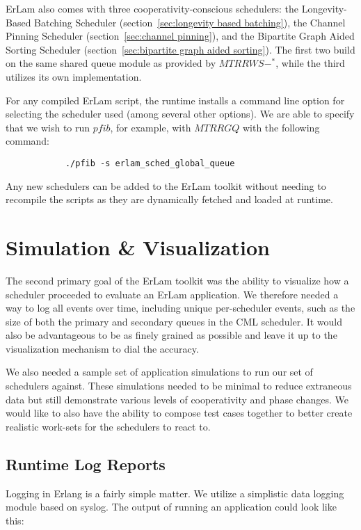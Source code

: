 ErLam also comes with three cooperativity-conscious schedulers: the 
Longevity-Based Batching Scheduler (section~\ref{sec:longevity based batching}),
the Channel Pinning Scheduler (section~\ref{sec:channel pinning}), and the
Bipartite Graph Aided Sorting Scheduler (section~\ref{sec:bipartite graph aided sorting}).
The first two build on the same shared queue module as provided by $MTRRWS-^{*}$, 
while the third utilizes its own implementation.

For any compiled ErLam script, the runtime installs a command line option for
selecting the scheduler used (among several other options). We are able to 
specify that we wish to run $pfib$, for example, with $MTRRGQ$ with
the following command:
\begin{verbatim}
            ./pfib -s erlam_sched_global_queue 
\end{verbatim}
\noindent
Any new schedulers can be added to the ErLam toolkit without needing to 
recompile the scripts as they are dynamically fetched and loaded at runtime. 

\section{Simulation \& Visualization}\label{sec:simulation and visualization}

The second primary goal of the ErLam toolkit was the ability to visualize 
how a scheduler proceeded to evaluate an ErLam application. We therefore needed
a way to log all events over time, including unique per-scheduler events, such 
as the size of both the primary and secondary queues in the CML scheduler. It 
would also be advantageous to be as finely grained as possible and leave it up to 
the visualization mechanism to dial the accuracy.

We also needed a sample set of application simulations to run our set of 
schedulers against. These simulations needed to be minimal to reduce
extraneous data but still demonstrate various levels of cooperativity and phase 
changes. We would like to also have the ability to compose test cases 
together to better create realistic work-sets for the schedulers to react to.

\subsection{Runtime Log Reports}\label{sec:runtime log reports}

Logging in Erlang is a fairly simple matter. We utilize a simplistic data 
logging module based on syslog. The output of running an application 
could look like this:

